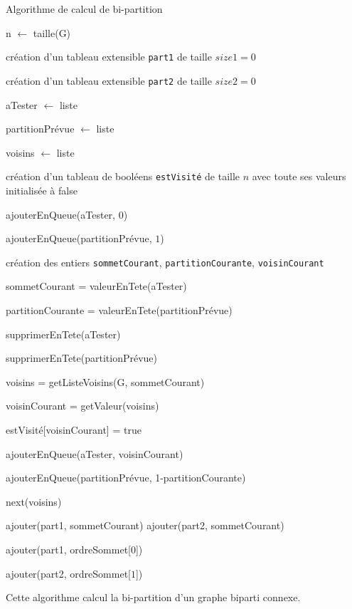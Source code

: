 \documentclass[a4paper,10pt]{article}
\begin{document}
\begin{algorithm}[H]
\caption{Algorithme de calcul de bi-partition}
\BlankLine
n $\leftarrow$ taille(G)

création d'un tableau extensible \texttt{part1} de taille $size1=0$

création d'un tableau extensible \texttt{part2} de taille $size2=0$

aTester $\leftarrow$ liste

partitionPrévue $\leftarrow$ liste

voisins $\leftarrow$ liste

création d'un tableau de booléens \texttt{estVisité} de taille $n$ avec toute ses valeurs initialisée à false

\bigskip
ajouterEnQueue(aTester, $0$)

ajouterEnQueue(partitionPrévue, $1$)

création des entiers \texttt{sommetCourant}, \texttt{partitionCourante}, \texttt{voisinCourant}

{
	sommetCourant = valeurEnTete(aTester)
	
	partitionCourante = valeurEnTete(partitionPrévue)
	
	supprimerEnTete(aTester)
	
	supprimerEnTete(partitionPrévue)
	
	voisins = getListeVoisins(G, sommetCourant)
	
	{
		voisinCourant = getValeur(voisins)
		
		{
			estVisité[voisinCourant] = true
			
			ajouterEnQueue(aTester, voisinCourant)

			ajouterEnQueue(partitionPrévue, 1-partitionCourante)
		}		
		
		next(voisins)
	}
	
	{
		ajouter(part1, sommetCourant)
	}
	{
		ajouter(part2, sommetCourant)
	}
}

ajouter(part1, ordreSommet[$0$])

ajouter(part2, ordreSommet[$1$])


\end{algorithm}
\bigskip

Cette algorithme calcul la bi-partition d'un graphe biparti connexe.
\end{document}
